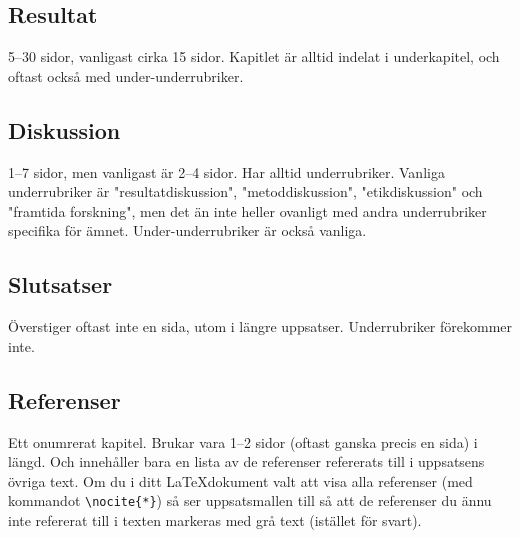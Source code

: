 \subsection{Resultat}
\label{rubrik.resultat}

5--30 sidor, vanligast cirka 15 sidor. Kapitlet är alltid indelat i
underkapitel, och oftast också med under-underrubriker.


\subsection{Diskussion}
\label{rubrik.diskussion}

1--7 sidor, men vanligast är 2--4 sidor. Har alltid underrubriker. Vanliga
underrubriker är "resultatdiskussion", "metoddiskussion", "etikdiskussion" och
"framtida forskning", men det än inte heller ovanligt med andra underrubriker
specifika för ämnet. Under-underrubriker är också vanliga.


\subsection{Slutsatser}
\label{rubrik.slutsats}

Överstiger oftast inte en sida, utom i längre uppsatser. Underrubriker
förekommer inte.


\subsection{Referenser}
\label{rubrik.referenser}

Ett onumrerat kapitel. Brukar vara 1--2 sidor (oftast ganska precis en sida) i
längd. Och innehåller bara en lista av de referenser refererats till i
uppsatsens övriga text. Om du i ditt \LaTeX dokument valt att visa alla
referenser (med kommandot \verb|\nocite{*}|) så ser uppsatsmallen till så att
de referenser du ännu inte refererat till i texten markeras med grå text
(istället för svart).

